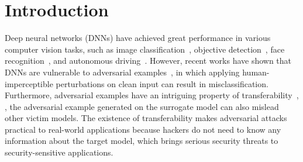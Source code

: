 


\section{Introduction}
Deep neural networks (DNNs) have achieved great performance in various computer vision tasks, such as image classification~\cite{simonyan2015very,he2016deep,szegedy2016rethinking}, objective detection~\cite{girshick2015fast, ren2015faster, he2017mask}, face recognition~\cite{taigman2014deepface, deng2019arcface, an2022pfc}, and autonomous driving~\cite{yu2022dual, wu2023transformation, wu2023policy}. However, recent works have shown that DNNs are vulnerable to adversarial examples~\cite{szegedy2014intriguing, goodfellow2015explaining}, in which applying human-imperceptible perturbations on clean input can result in misclassification. Furthermore, adversarial examples have an intriguing property of transferability~\cite{dong2018boosting, lin2020nesterov}, \ie, the adversarial example generated on the surrogate model can also mislead other victim models. The existence of transferability makes adversarial attacks practical to real-world applications because hackers do not need to know any information about the target model, which brings serious security threats to security-sensitive applications.


